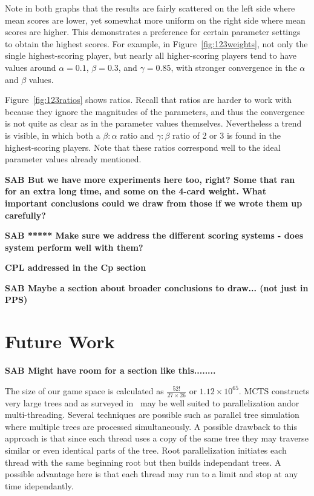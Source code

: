 \documentclass[letterpaper]{article}
\begin{document}
Note in both graphs that the results are fairly scattered on the left side where mean scores are lower, yet somewhat more uniform on the right side where mean scores are higher. This demonstrates a preference for certain parameter settings to obtain the highest scores. For example, in Figure~\ref{fig:123weights}, not only the single highest-scoring player, but nearly all higher-scoring players tend to have values around $\alpha = 0.1$, $\beta = 0.3$, and $\gamma = 0.85$, with stronger convergence in the $\alpha$ and $\beta$ values.

Figure~\ref{fig:123ratios} shows ratios. Recall that ratios are harder to work with because they ignore the magnitudes of the parameters, and thus the convergence is not quite as clear as in the parameter values themselves. Nevertheless a trend is visible, in which both a $\beta : \alpha$ ratio and $\gamma : \beta$ ratio of 2 or 3 is found in the highest-scoring players. Note that these ratios correspond well to the ideal parameter values already mentioned.

{\bf SAB But we have more experiments here too, right? Some that ran for an extra long time, and some on the 4-card weight. What important conclusions could we draw from those if we wrote them up carefully?}

{\bf SAB ***** Make sure we address the different scoring systems - does system perform well with them?}

{\bf CPL addressed in the Cp section}

{\bf SAB Maybe a section about broader conclusions to draw... (not just in PPS)}

\section{Future Work}

{\bf SAB Might have room for a section like this........}

The size of our game space is calculated as $\frac{52!}{27\times26}$ or $1.12 \times 10^{65}$. MCTS constructs very large trees and as surveyed in~\cite{browne2012survey} may be well suited to parallelization and\/or multi-threading. Several techniques are possible such as parallel tree simulation where multiple trees are processed simultaneously. A possible drawback to this approach is that since each thread uses a copy of the same tree they may traverse similar or even identical parts of the tree. Root parallelization initiates each thread with the same beginning root but then builds independant trees. A possible advantage here is that each thread may run to a limit and stop at any time idependantly.
\end{document}
